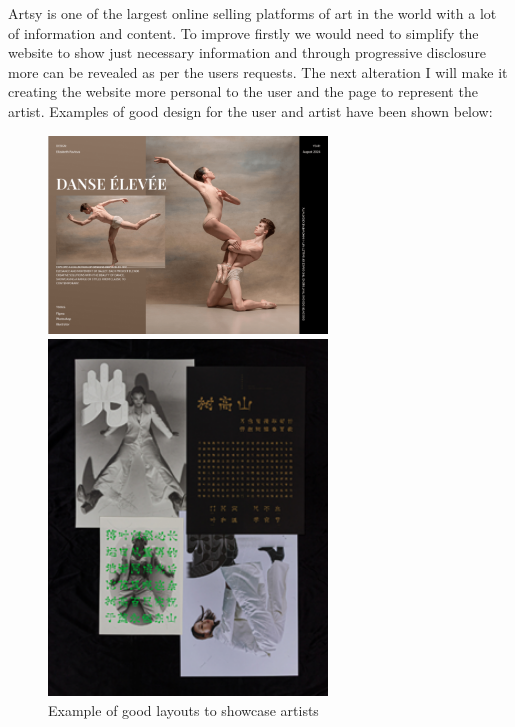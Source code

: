 \documentclass[]{project_interim}
\begin{document}
\newpage

Artsy is one of the largest online selling platforms of art in the world with a lot of information and content. To improve firstly we would need to simplify the website to show just necessary information and through progressive disclosure more can be revealed as per the users requests.
The next alteration I will make it creating the website more personal to the user and the page to represent the artist. Examples of good design for the user and artist have been shown below:

\begin{figure}[ht!]
  \centering
  \begin{minipage}[t]{0.4\textwidth}
    \includegraphics[width=20em]{artGalleryExample.png}
  \end{minipage}
  \hfill
  \begin{minipage}[t]{0.4\textwidth}
    \includegraphics[width=20em]{artGalleryExample2.png}
  \end{minipage}
  \caption{Example of good layouts to showcase artists}
  \label{fig:1}
\end{figure}
\end{document}
